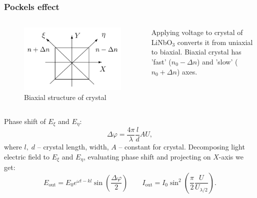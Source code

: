 \documentclass{beamer}
\begin{document}
\begin{frame}
	\frametitle{Pockels effect}
	
	\begin{columns}
		\begin{column}{0.5\linewidth}
			\begin{figure}
				\centering
				\includegraphics[width=\linewidth]{res/pockels}
				\caption{Biaxial structure of crystal}
			\end{figure}
			
		\end{column}
		\begin{column}{0.5\linewidth}
			Applying voltage to crystal of LiNbO$_3$ converts it from uniaxial to biaxial.
			Biaxial crystal has 'fast' ($n_0 - \Delta n$) and 'slow' ($n_0 + \Delta n$) axes.
			
		\end{column}
	\end{columns}
	\footnotesize
	Phase shift of $E_{\xi}$ and $E_{\eta}$:
	$$ \Delta \varphi = \frac{4\pi}{\lambda} \frac{l}{d} AU,$$
	where $l, \; d$ -- crystal length, width, $A$ -- constant for crystal.
	Decomposing light electric field to $E_{\xi}$ and $E_{\eta}$, evaluating phase shift and projecting on $X$-axis we get:
	$$ E_{\text{out}} = E_0 e^{\omega t - k l} \sin\left(\frac{\Delta \varphi}{2}\right) \qquad I_{\text{out}} = I_0 \sin^2\left(\frac{\pi}{2}\frac{U}{U_{\lambda/2}}\right).$$
\end{frame}
\end{document}
